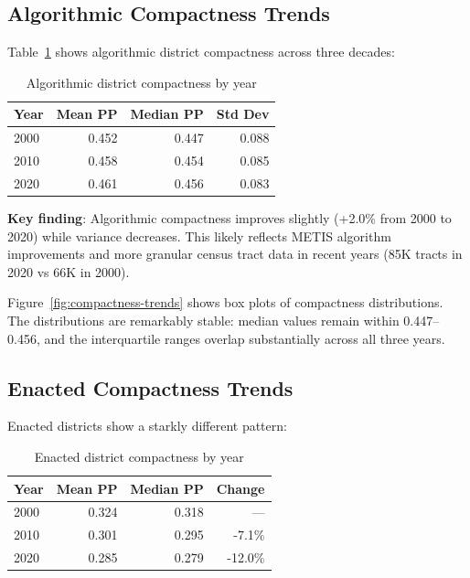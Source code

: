 
\subsection{Algorithmic Compactness Trends}

Table~\ref{tab:algo-compactness} shows algorithmic district compactness across three decades:

\begin{table}[h]
\centering
\begin{tabular}{lrrr}
\toprule
\textbf{Year} & \textbf{Mean PP} & \textbf{Median PP} & \textbf{Std Dev} \\
\midrule
2000 & 0.452 & 0.447 & 0.088 \\
2010 & 0.458 & 0.454 & 0.085 \\
2020 & 0.461 & 0.456 & 0.083 \\
\bottomrule
\end{tabular}
\caption{Algorithmic district compactness by year}
\label{tab:algo-compactness}
\end{table}

\textbf{Key finding}: Algorithmic compactness improves slightly (+2.0\% from 2000 to 2020) while variance decreases. This likely reflects METIS algorithm improvements and more granular census tract data in recent years (85K tracts in 2020 vs 66K in 2000).

Figure~\ref{fig:compactness-trends} shows box plots of compactness distributions. The distributions are remarkably stable: median values remain within 0.447--0.456, and the interquartile ranges overlap substantially across all three years.

\subsection{Enacted Compactness Trends}

Enacted districts show a starkly different pattern:

\begin{table}[h]
\centering
\begin{tabular}{lrrr}
\toprule
\textbf{Year} & \textbf{Mean PP} & \textbf{Median PP} & \textbf{Change} \\
\midrule
2000 & 0.324 & 0.318 & --- \\
2010 & 0.301 & 0.295 & -7.1\% \\
2020 & 0.285 & 0.279 & -12.0\% \\
\bottomrule
\end{tabular}
\caption{Enacted district compactness by year}
\label{tab:enacted-compactness}
\end{table}

